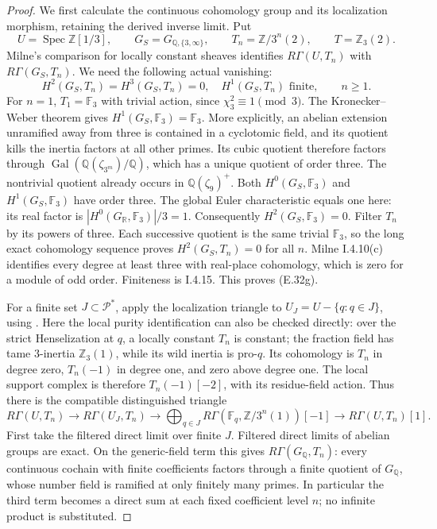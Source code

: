 \begin{proof}
We first calculate the continuous cohomology group and its
localization morphism, retaining the derived inverse limit.
Put
\[
 U=\operatorname{Spec}\mathbb Z[1/3],\qquad
 G_S=G_{\mathbb Q,\{3,\infty\}},\qquad
 T_n=\mathbb Z/3^n(2),\qquad T=\mathbb Z_3(2).
\]
Milne's comparison for locally constant sheaves
\cite[II.2.9]{E_MilneADT} identifies
$R\Gamma(U,T_n)$ with $R\Gamma(G_S,T_n)$.
We need the following actual vanishing:
\[
 H^2(G_S,T_n)=H^3(G_S,T_n)=0,
 \quad H^1(G_S,T_n)\text{ finite},\qquad n\ge1.                \tag{E.32g}
\]
For $n=1$, $T_1=\mathbb F_3$ with trivial action, since
$\chi_3^2\equiv1\pmod3$.
The Kronecker--Weber theorem
\cite[I.4.16]{E_MilneCFT} gives
$H^1(G_S,\mathbb F_3)=\mathbb F_3$.
More explicitly, an abelian extension unramified away from
three is contained in a cyclotomic field, and its quotient
kills the inertia factors at all other primes. Its cubic
quotient therefore factors through
$\operatorname{Gal}(\mathbb Q(\zeta_{3^m})/\mathbb Q)$,
which has a unique quotient of order three. The nontrivial
quotient already occurs in $\mathbb Q(\zeta_9)^+$.
Both $H^0(G_S,\mathbb F_3)$ and $H^1(G_S,\mathbb F_3)$
have order three. The global Euler characteristic
\cite[I.5.1]{E_MilneADT} equals one here: its real factor is
$|H^0(G_{\mathbb R},\mathbb F_3)|/3=1$.
Consequently $H^2(G_S,\mathbb F_3)=0$.
Filter $T_n$ by its powers of three. Each successive quotient
is the same trivial $\mathbb F_3$, so the long exact
cohomology sequence proves $H^2(G_S,T_n)=0$ for all $n$.
Milne I.4.10(c) identifies every degree at least three with
real-place cohomology, which is zero for a module of odd order.
Finiteness is I.4.15. This proves (E.32g).

For a finite set $J\subset\mathcal P^*$, apply the
localization triangle to
$U_J=U-\{q:q\in J\}$, using
\cite[II.0.1(f), II.1.7(b)]{E_MilneADT}.
Here the local purity identification can also be checked
directly: over the strict Henselization at $q$, a locally
constant $T_n$ is constant; the fraction field has tame
$3$-inertia $\mathbb Z_3(1)$, while its wild inertia is
pro-$q$. Its cohomology is $T_n$ in degree zero,
$T_n(-1)$ in degree one, and zero above degree one.
The local support complex is therefore
$T_n(-1)[-2]$, with its residue-field action.
Thus there is the compatible distinguished triangle
\[
 R\Gamma(U,T_n)\longrightarrow R\Gamma(U_J,T_n)
 \longrightarrow\bigoplus_{q\in J}
       R\Gamma(\mathbb F_q,\mathbb Z/3^n(1))[-1]
 \longrightarrow R\Gamma(U,T_n)[1].                         \tag{E.32h}
\]
First take the filtered direct limit over finite $J$.
Filtered direct limits of abelian groups are exact. On the
generic-field term this gives $R\Gamma(G_{\mathbb Q},T_n)$:
every continuous cochain with finite coefficients factors
through a finite quotient of $G_{\mathbb Q}$, whose number
field is ramified at only finitely many primes.
In particular the third term becomes a direct sum at each
fixed coefficient level $n$; no infinite product is substituted.


\end{proof}
